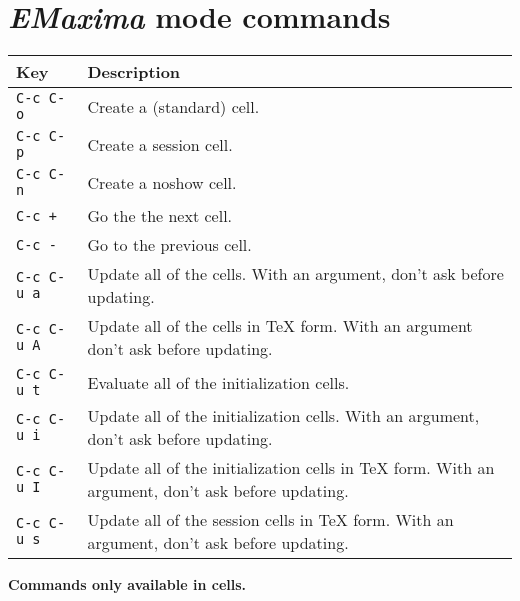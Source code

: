 \documentclass{article}
\newcommand{\emx}{\textsl{\sffamily EMaxima}}
\begin{document}
\section{\emx{} mode commands}
\label{app:emx}

\noindent
\begin{tabular}{p{\firstcol}p{\secondcol}}
\hline
\textbf{Key} & \textbf{Description}\\
\hline
\texttt{C-c C-o} & Create a (standard) cell.\\
\texttt{C-c C-p} & Create a session cell.\\
\texttt{C-c C-n} & Create a noshow cell.\\
\texttt{C-c +} & Go the the next cell.\\
\texttt{C-c -} & Go to the previous cell.\\
\texttt{C-c C-u a} & 
Update all of the cells.  With an argument, don't ask before updating.\\
\texttt{C-c C-u A}
& Update all of the cells in \TeX{} form. With an argument don't ask
before updating.\\
\texttt{C-c C-u t}
& Evaluate all of the initialization cells.\\
\texttt{C-c C-u i}
& Update all of the initialization cells.  With an argument, don't
ask before updating.\\
\texttt{C-c C-u I}
& Update all of the initialization cells in \TeX{} form.  With an
argument, don't ask before updating.\\
\texttt{C-c C-u s}
& Update all of the session cells in \TeX{} form.  With an
argument, don't ask before updating.
\end{tabular}

\newpage

\noindent
\textbf{Commands only available in cells.}

\smallskip
\end{document}
